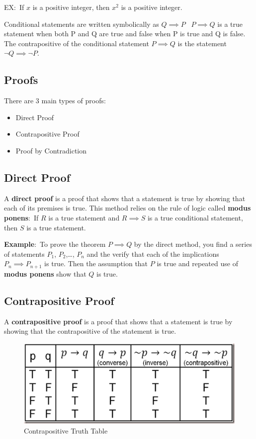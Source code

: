 \documentclass{article}
\begin{document}
EX$\colon$ If $x$ is a positive integer, then $x^2$ is a positive integer.


Conditional statements are written symbolically as $Q \implies P$ 
\
$P \implies Q$ is a true statement when both P and Q are
true and false when P is true and Q is false. 
The contrapositive of the conditional statement $P \implies Q$ is the statement $\lnot Q \implies \lnot P$. 
\subsection*{Proofs}

There are 3 main types of proofs:
\begin{itemize}
    \item Direct Proof
    \item Contrapositive Proof
    \item Proof by Contradiction
\end{itemize}

\subsection*{Direct Proof}
A \textbf{direct proof} is a proof that shows that a statement is true by showing that each of its premises is true.
This method relies on the rule of logic called 
\textbf{modus ponens$\colon$} If $R$ is a true statement and $R \implies S $ is a true conditional
statement, then $S$ is a true statement.


\textbf{Example$\colon$} To prove the theorem $ P \implies Q$ by the direct
method, you find a series of statements $P_1$, $P_2$,\ldots, $P_n$ 
and the verify that each of the implications $P_n\implies P_{n+1}$ is true.
Then
the assumption that $P$ is true and repeated use of \textbf{modus ponens} show that $Q$ is true.

\subsection*{Contrapositive Proof}
A \textbf{contrapositive proof} is a proof that shows that a statement is true by showing that the contrapositive of the statement is true.
\begin{figure}[h]
    \centering
    \includegraphics[scale=0.5]{contrapositive.png}
    \caption{Contrapositive Truth Table}\label{fig:contrapositive truth table}
\end{figure}
\end{document}
